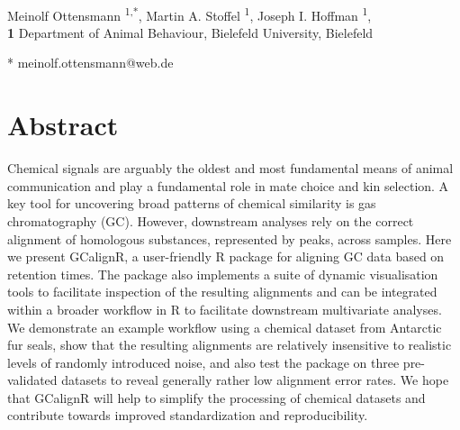 \documentclass[10pt,letterpaper]{article}
\date{}
\begin{document}
\vspace*{0.2in}
\def\code#1{\texttt{#1}}
\begin{flushleft}
{\Large
\textbf{} 
}
\newline
\\
Meinolf Ottensmann \textsuperscript{1,*},
Martin A. Stoffel \textsuperscript{1},
Joseph I. Hoffman \textsuperscript{1},
\\
\bigskip
\textbf{1} Department of Animal Behaviour, Bielefeld University, Bielefeld
\\
\bigskip

* meinolf.ottensmann@web.de

\end{flushleft}
\section*{Abstract}
Chemical signals are arguably the oldest and most fundamental means of animal communication and play a fundamental role in mate choice and kin selection. A key tool for uncovering broad patterns of chemical similarity is gas chromatography (GC). However, downstream analyses rely on the correct alignment of homologous substances, represented by peaks, across samples. Here we present GCalignR, a user-friendly R package for aligning GC data based on retention times.  The package also implements a suite of dynamic visualisation tools to facilitate inspection of the resulting alignments and can be integrated within a broader workflow in R to facilitate downstream multivariate analyses. We demonstrate an example workflow using a chemical dataset from Antarctic fur seals, show that the resulting alignments are relatively insensitive to realistic levels of randomly introduced noise, and also test the package on three pre-validated datasets to reveal generally rather low alignment error rates. We hope that GCalignR will help to simplify the processing of chemical datasets and contribute towards improved standardization and reproducibility.
\linenumbers

\end{document}
